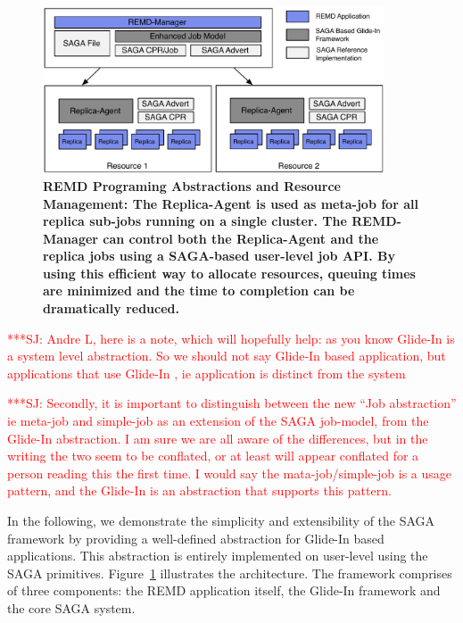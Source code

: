\documentclass{rspublic}
\newcommand{\jhanote}[1]{ {\textcolor{red} { ***SJ: #1 }}}
\newcommand{\jhanote}[1]{}
\newcommand{\glidein}[1]{Glide-In }
\newcommand{\replicaagent}[1]{Replica-Agent }
\begin{document}
\begin{figure}[th]
    \centering
    \includegraphics[width=0.9\textwidth]{remdmanager_v11}
    \caption{\footnotesize \bf REMD Programing Abstractions and
      Resource Management: The Replica-Agent is used as meta-job for
      all replica sub-jobs running on a single cluster. The
      REMD-Manager can control both the \replicaagent\ and the replica
      jobs using a SAGA-based user-level job API. By using this
      efficient way to allocate resources, queuing times are minimized
      and the time to completion can be dramatically reduced.}
    \label{fig:remdmanager_v1.1}
\end{figure}

\jhanote{Andre L, here is a note, which will hopefully help: as you
  know \glidein\ is a system level abstraction. So we should not say
  \glidein\ based application, but applications that use \glidein\ ,
  ie application is distinct from the system}

\jhanote{Secondly, it is important to distinguish between the new
  ``Job abstraction'' ie meta-job and simple-job as an extension of
  the SAGA job-model, from the \glidein\ abstraction. I am sure we are
  all aware of the differences, but in the writing the two seem to be
  conflated, or at least will appear conflated for a person reading
  this the first time. I would say the mata-job/simple-job is a usage
  pattern, and the \glidein\ is an abstraction that supports this
  pattern.}

In the following, we demonstrate the simplicity and extensibility of
the SAGA framework by providing a well-defined abstraction for
\glidein\ based applications. This abstraction is entirely implemented
on user-level using the SAGA primitives.
Figure~\ref{fig:remdmanager_v1.1} illustrates the architecture.  The
framework comprises of three components: the REMD application itself,
the \glidein\ framework and the core SAGA system.
        
\end{document}
